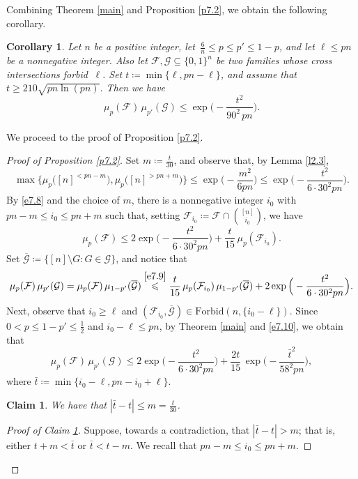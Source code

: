 \documentclass[10pt]{amsart}
\newtheorem{cor}[thm]{Corollary}
\newtheorem{claim}[thm]{Claim}
\theoremstyle{remark}
\newcommand{\meg}{\geqslant}
\newcommand{\mik}{\leqslant}
\newcommand{\Fcal}{\mathcal{F}}
\newcommand{\Gcal}{\mathcal{G}}
\begin{document}
Combining Theorem \ref{main} and Proposition \ref{p7.2}, we obtain the following corollary.
\begin{cor} \label{c7.3}
Let $n$ be a positive integer, let\, $\frac{6}{n}\mik p\mik p'\mik 1-p$, and
let $\ell\mik pn$ be a nonnegative integer. Also let $\Fcal,\Gcal\subseteq \{0,1\}^n$ be two families whose
cross intersections forbid\, $\ell$. Set $t\coloneqq \min\{\ell,pn-\ell\}$, and assume that
$t\meg 210 \sqrt{pn\ln(pn)}$. Then we have
\begin{equation} \label{e7.7}
\mu_p(\Fcal)\, \mu_{p'}(\Gcal) \mik \exp\Big( - \frac{t^2}{90^2\, pn}\Big).
\end{equation}
\end{cor}
We proceed to the proof of Proposition \ref{p7.2}.
\begin{proof}[Proof of Proposition \emph{\ref{p7.2}}]
Set $m\coloneqq \frac{t}{30}$, and observe that, by Lemma \ref{l2.3},
\begin{equation} \label{e7.8}
\max\big\{ \mu_p\big([n]^{<pn-m}\big), \mu_p\big([n]^{>pn+m}\big)\big\} \mik \exp\Big(-\frac{m^2}{6pn}\Big)
\mik \exp\Big(- \frac{t^2}{6\cdot 30^2pn}\Big).
\end{equation}
By \eqref{e7.8} and the choice of $m$, there is a nonnegative integer $i_0$ with $pn-m\mik i_0\mik pn+m$
such that, setting $\Fcal_{i_0}\coloneqq \Fcal\cap \binom{[n]}{i_0}$, we have
\begin{equation} \label{e7.9}
\mu_p(\Fcal) \mik 2\exp\Big(- \frac{t^2}{6\cdot 30^2pn}\Big)+\frac{t}{15}\, \mu_p(\Fcal_{i_0}).
\end{equation}
Set $\overline{\Gcal}\coloneqq \big\{ [n]\setminus G: G\in \Gcal\big\}$, and notice that
\begin{equation} \label{e7.10}
\mu_p(\Fcal)\, \mu_{p'}(\Gcal)=\mu_p(\Fcal)\, \mu_{1-p'}(\overline{\Gcal}) \stackrel{\eqref{e7.9}}{\mik}
\frac{t}{15}\, \mu_p(\Fcal_{i_0})\, \mu_{1-p'}(\overline{\Gcal}) + 2\exp\Big(- \frac{t^2}{6\cdot 30^2pn}\Big).
\end{equation}
Next, observe that $i_0\meg \ell$ and $(\Fcal_{i_0},\overline{\Gcal})\in\mathrm{Forbid}(n,\{i_0-\ell\})$.
Since $0<p\mik 1-p'\mik \frac12$ and $i_0-\ell\mik pn$, by Theorem \ref{main} and \eqref{e7.10}, we obtain that
\begin{equation} \label{e7.11}
\mu_p(\Fcal)\, \mu_{p'}(\Gcal) \mik  2\exp\Big(- \frac{t^2}{6\cdot 30^2pn}\Big) +
\frac{2t}{15}\,  \exp\Big(- \frac{\bar{t}^2}{58^2 pn}\Big),
\end{equation}
where $\bar{t}\coloneqq \min\{i_0-\ell, pn-i_0+\ell\}$.
\begin{claim} \label{cnew}
We have that $|\bar{t}-t|\mik m=\frac{t}{30}$.
\end{claim}
\begin{proof}[Proof of Claim \emph{\ref{cnew}}]
Suppose, towards a contradiction, that $|\bar{t}-t|>m$; that is, either $t+m<\bar{t}$ or $\bar{t}<t-m$.
We recall that $pn-m\mik i_0\mik pn+m$.


\end{proof}
\end{proof}
\end{document}
